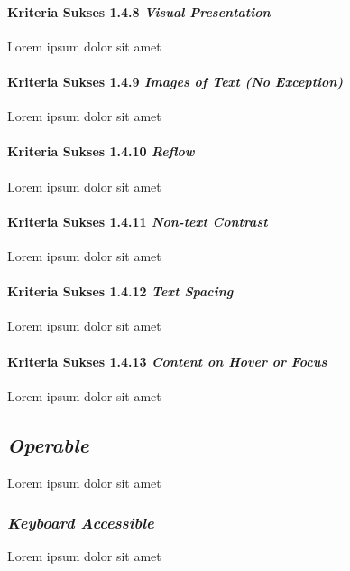 \paragraph{Kriteria Sukses 1.4.8 \textit{Visual Presentation}}
\label{sec:kriteria_sukses_1.4.8}
Lorem ipsum dolor sit amet

\paragraph{Kriteria Sukses 1.4.9 \textit{Images of Text (No Exception)}}
\label{sec:kriteria_sukses_1.4.9}
Lorem ipsum dolor sit amet

\paragraph{Kriteria Sukses 1.4.10 \textit{Reflow}}
\label{sec:kriteria_sukses_1.4.10}
Lorem ipsum dolor sit amet

\paragraph{Kriteria Sukses 1.4.11 \textit{Non-text Contrast}}
\label{sec:kriteria_sukses_1.4.11}
Lorem ipsum dolor sit amet

\paragraph{Kriteria Sukses 1.4.12 \textit{Text Spacing}}
\label{sec:kriteria_sukses_1.4.12}
Lorem ipsum dolor sit amet

\paragraph{Kriteria Sukses 1.4.13 \textit{Content on Hover or Focus}}
\label{sec:kriteria_sukses_1.4.13}
Lorem ipsum dolor sit amet


\subsection{\textit{Operable}}
\label{sec:operable}
Lorem ipsum dolor sit amet

\subsubsection{\textit{Keyboard Accessible}}
\label{sec:keyboard_accessible}
Lorem ipsum dolor sit amet

